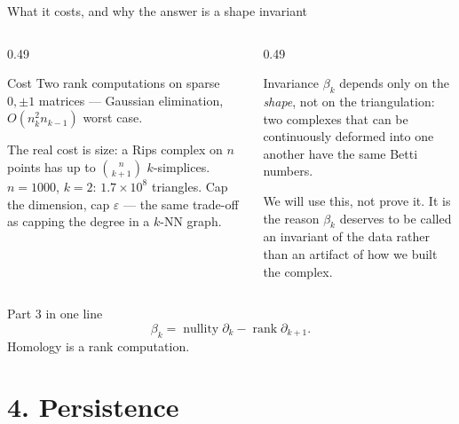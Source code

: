\documentclass[10pt,aspectratio=169]{beamer}
\newcommand{\rank}{\operatorname{rank}}
\newcommand{\nullity}{\operatorname{nullity}}
\begin{document}
    \begin{frame}{What it costs, and why the answer is a shape invariant}
        \begin{columns}[T,onlytextwidth]
            \begin{column}{0.49\textwidth}
                \begin{block}{Cost}
                    \scriptsize
                    Two rank computations on sparse $0,\pm1$ matrices --- Gaussian elimination,
                    $O(n_k^2 n_{k-1})$ worst case.

                    \vspace{0.3em}
                    The real cost is \alert{size}: a Rips complex on $n$ points has up to
                    $\binom{n}{k+1}$ $k$-simplices. $n=1000$, $k=2$: $1.7\times 10^8$ triangles.
                    Cap the dimension, cap $\varepsilon$ --- the same trade-off as capping the degree
                    in a $k$-NN graph.
                \end{block}
            \end{column}
            \begin{column}{0.49\textwidth}
                \begin{block}{Invariance}
                    \scriptsize
                    $\beta_k$ depends only on the \emph{shape}, not on the triangulation: two complexes
                    that can be continuously deformed into one another have the same Betti numbers.

                    \vspace{0.3em}
                    We will use this, not prove it. It is the reason $\beta_k$ deserves to be called an
                    invariant of the data rather than an artifact of how we built the complex.
                \end{block}
            \end{column}
        \end{columns}

        \vspace{0.7em}

        \begin{alertblock}{Part 3 in one line}
            \[
                \beta_k=\nullity\partial_k-\rank\partial_{k+1}.
            \]
            \centering Homology is a rank computation.
        \end{alertblock}
    \end{frame}

    \section{4. Persistence}
\end{document}
